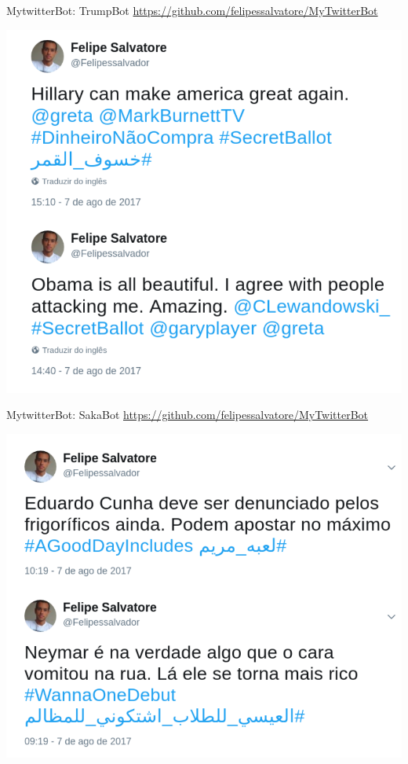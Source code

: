 \documentclass[10pt]{beamer}
\begin{document}
\begin{frame}{MytwitterBot: TrumpBot}
\url{https://github.com/felipessalvatore/MyTwitterBot}
\begin{center}
\includegraphics[scale=0.24]{images/TrumpBot.png}
\end{center}
\end{frame}

\begin{frame}{MytwitterBot: SakaBot}
\url{https://github.com/felipessalvatore/MyTwitterBot}
\begin{center}
\includegraphics[scale=0.24]{images/SakaBot.png}
\end{center}
\end{frame}
\end{document}
